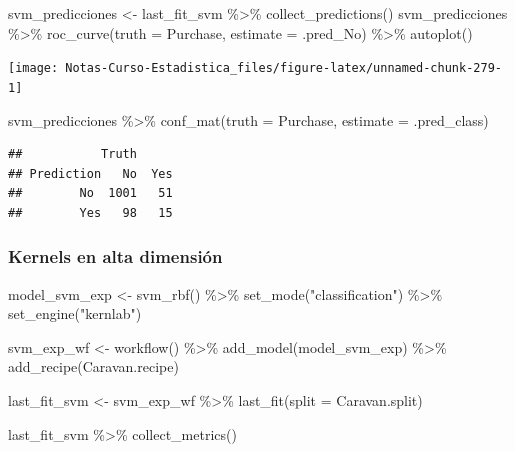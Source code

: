 \documentclass[
  12pt,
]{book}
\newenvironment{Shaded}{\begin{snugshade}}{\end{snugshade}}
\newcommand{\AttributeTok}[1]{\textcolor[rgb]{0.77,0.63,0.00}{#1}}
\newcommand{\FunctionTok}[1]{\textcolor[rgb]{0.00,0.00,0.00}{#1}}
\newcommand{\NormalTok}[1]{#1}
\newcommand{\OtherTok}[1]{\textcolor[rgb]{0.56,0.35,0.01}{#1}}
\newcommand{\SpecialCharTok}[1]{\textcolor[rgb]{0.00,0.00,0.00}{#1}}
\newcommand{\StringTok}[1]{\textcolor[rgb]{0.31,0.60,0.02}{#1}}
\begin{document}
\begin{Shaded}
\begin{Highlighting}[]
\NormalTok{svm\_predicciones }\OtherTok{\textless{}{-}}\NormalTok{ last\_fit\_svm }\SpecialCharTok{\%\textgreater{}\%}
    \FunctionTok{collect\_predictions}\NormalTok{()}
\NormalTok{svm\_predicciones }\SpecialCharTok{\%\textgreater{}\%}
    \FunctionTok{roc\_curve}\NormalTok{(}\AttributeTok{truth =}\NormalTok{ Purchase, }\AttributeTok{estimate =}\NormalTok{ .pred\_No) }\SpecialCharTok{\%\textgreater{}\%}
    \FunctionTok{autoplot}\NormalTok{()}
\end{Highlighting}
\end{Shaded}

\begin{center}\texttt{[image: Notas-Curso-Estadistica\_files/figure-latex/unnamed-chunk-279-1]} \end{center}

\begin{Shaded}
\begin{Highlighting}[]
\NormalTok{svm\_predicciones }\SpecialCharTok{\%\textgreater{}\%}
    \FunctionTok{conf\_mat}\NormalTok{(}\AttributeTok{truth =}\NormalTok{ Purchase, }\AttributeTok{estimate =}\NormalTok{ .pred\_class)}
\end{Highlighting}
\end{Shaded}

\begin{verbatim}
##           Truth
## Prediction   No  Yes
##        No  1001   51
##        Yes   98   15
\end{verbatim}

\hypertarget{kernels-en-alta-dimensiuxf3n}{%
\subsubsection{Kernels en alta
dimensión}\label{kernels-en-alta-dimensiuxf3n}}

\begin{Shaded}
\begin{Highlighting}[]
\NormalTok{model\_svm\_exp }\OtherTok{\textless{}{-}} \FunctionTok{svm\_rbf}\NormalTok{() }\SpecialCharTok{\%\textgreater{}\%}
    \FunctionTok{set\_mode}\NormalTok{(}\StringTok{"classification"}\NormalTok{) }\SpecialCharTok{\%\textgreater{}\%}
    \FunctionTok{set\_engine}\NormalTok{(}\StringTok{"kernlab"}\NormalTok{)}

\NormalTok{svm\_exp\_wf }\OtherTok{\textless{}{-}} \FunctionTok{workflow}\NormalTok{() }\SpecialCharTok{\%\textgreater{}\%}
    \FunctionTok{add\_model}\NormalTok{(model\_svm\_exp) }\SpecialCharTok{\%\textgreater{}\%}
    \FunctionTok{add\_recipe}\NormalTok{(Caravan.recipe)}

\NormalTok{last\_fit\_svm }\OtherTok{\textless{}{-}}\NormalTok{ svm\_exp\_wf }\SpecialCharTok{\%\textgreater{}\%}
    \FunctionTok{last\_fit}\NormalTok{(}\AttributeTok{split =}\NormalTok{ Caravan.split)}

\NormalTok{last\_fit\_svm }\SpecialCharTok{\%\textgreater{}\%}
    \FunctionTok{collect\_metrics}\NormalTok{()}
\end{Highlighting}
\end{Shaded}
\end{document}
